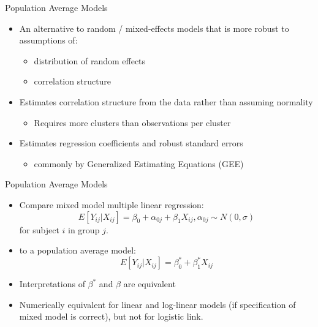 \documentclass[
  ignorenonframetext,
]{beamer}
\providecommand{\tightlist}{%
  \setlength{\itemsep}{0pt}\setlength{\parskip}{0pt}}
\begin{document}
\begin{frame}{Population Average Models}
\protect\hypertarget{population-average-models-1}{}

\begin{itemize}
\tightlist
\item
  An alternative to random / mixed-effects models that is more robust to
  assumptions of:

  \begin{itemize}
  \tightlist
  \item
    distribution of random effects
  \item
    correlation structure
  \end{itemize}
\item
  Estimates correlation structure from the data rather than assuming
  normality

  \begin{itemize}
  \tightlist
  \item
    Requires more clusters than observations per cluster
  \end{itemize}
\item
  Estimates regression coefficients and robust standard errors

  \begin{itemize}
  \tightlist
  \item
    commonly by Generalized Estimating Equations (GEE)
  \end{itemize}
\end{itemize}

\end{frame}

\begin{frame}{Population Average Models}
\protect\hypertarget{population-average-models-2}{}

\begin{itemize}
\item
  Compare mixed model multiple linear regression: \[
  E[Y_{ij}|X_{ij}] = \beta_0 + \alpha_{0j} + \beta_1 X_{ij}, \alpha_{0j} \sim N(0, \sigma)
  \] for subject \(i\) in group \(j\).
\item
  to a population average model: \[
  E[Y_{ij}|X_{ij}] = \beta_0^* + \beta_1^* X_{ij}
  \]
\item
  Interpretations of \(\beta^*\) and \(\beta\) are equivalent
\item
  Numerically equivalent for linear and log-linear models (if
  specification of mixed model is correct), but not for logistic link.
\end{itemize}

\end{frame}
\end{document}
